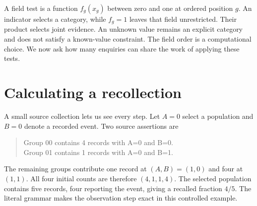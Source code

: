 \documentclass[reprint,aps,prx,superscriptaddress,nofootinbib,longbibliography]{revtex4-2}
\begin{document}
A field test is a function \(f_g(x_g)\) between zero and one at ordered position \(g\).
An indicator selects a category, while \(f_g=1\) leaves that field unrestricted.
Their product selects joint evidence.
An unknown value remains an explicit category and does not satisfy a known-value constraint.
The field order is a computational choice.
We now ask how many enquiries can share the work of applying these tests.

\section{Calculating a recollection}
\label{sec:grading}
A small source collection lets us see every step.
Let \(A=0\) select a population and \(B=0\) denote a recorded event.
Two source assertions are
\begin{quote}\small
Group 00 contains 4 records with A=0 and B=0.\\
Group 01 contains 1 records with A=0 and B=1.
\end{quote}
The remaining groups contribute one record at \((A,B)=(1,0)\) and four at \((1,1)\).
All four initial counts are therefore \((4,1,1,4)\).
The selected population contains five records, four reporting the event, giving a recalled fraction \(4/5\).
The literal grammar makes the observation step exact in this controlled example.
\end{document}
